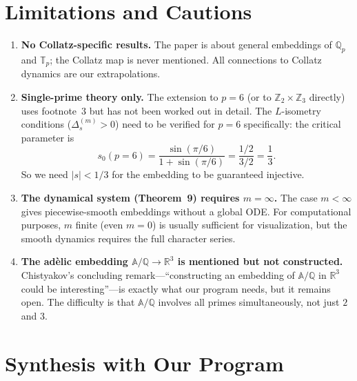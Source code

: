 \documentclass[11pt,a4paper]{article}
\newcommand{\Z}{\mathbb{Z}}
\newcommand{\R}{\mathbb{R}}
\newcommand{\Q}{\mathbb{Q}}
\newcommand{\T}{\mathbb{T}}
\newcommand{\A}{\mathbb{A}}
\newcommand{\Qp}{\Q_p}
\theoremstyle{plain}
\theoremstyle{definition}
\begin{document}
\section{Limitations and Cautions}\label{sec:caution}

\begin{caution}
    \begin{enumerate}
        \item \textbf{No Collatz-specific results.} The paper is about general embeddings of $\Qp$ and $\T_p$; the Collatz map is never mentioned. All connections to Collatz dynamics are our extrapolations.

        \item \textbf{Single-prime theory only.} The extension to $p = 6$ (or to $\Z_2 \times \Z_3$ directly) uses footnote~3 but has not been worked out in detail. The $L$-isometry conditions ($\Delta_s^{(m)} > 0$) need to be verified for $p = 6$ specifically: the critical parameter is
        \begin{equation}
            s_0(p=6) = \frac{\sin(\pi/6)}{1 + \sin(\pi/6)} = \frac{1/2}{3/2} = \frac{1}{3}.
        \end{equation}
        So we need $|s| < 1/3$ for the embedding to be guaranteed injective.

        \item \textbf{The dynamical system (Theorem~9) requires $m = \infty$.} The case $m < \infty$ gives piecewise-smooth embeddings without a global ODE. For computational purposes, $m$ finite (even $m = 0$) is usually sufficient for visualization, but the smooth dynamics requires the full character series.

        \item \textbf{The ad\`elic embedding $\A/\Q \to \R^3$ is mentioned but not constructed.} Chistyakov's concluding remark---``constructing an embedding of $\A/\Q$ in $\R^3$ could be interesting''---is exactly what our program needs, but it remains open. The difficulty is that $\A/\Q$ involves all primes simultaneously, not just $2$ and $3$.
    \end{enumerate}
\end{caution}


\section{Synthesis with Our Program}\label{sec:synthesis}
\end{document}
